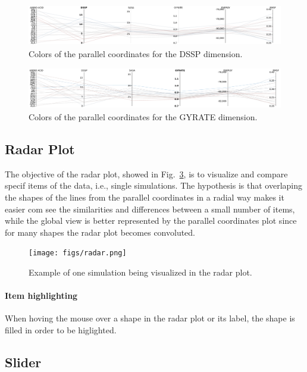 \documentclass[10pt, conference]{IEEEtran}
\begin{document}
\begin{figure}
\includegraphics[width=1.0\linewidth]{figs/dssp.png}
\caption{Colors of the parallel coordinates for the DSSP dimension.} 
\label{fig:dssp}
\end{figure}

\begin{figure}
\includegraphics[width=1.0\linewidth]{figs/gyrate.png}
\caption{Colors of the parallel coordinates for the GYRATE dimension.} 
\label{fig:gyrate}
\end{figure}

\subsection{Radar Plot}

The objective of the radar plot, showed in Fig.~\ref{fig:radar}, is to visualize and compare specif items of the data, i.e., single simulations. The hypothesis is that overlaping the shapes of the lines from the parallel coordinates in a radial way makes it easier com see the similarities and differences between a small number of items, while the global view is better represented by the parallel coordinates plot since for many shapes the radar plot becomes convoluted.  

\begin{figure}
\texttt{[image: figs/radar.png]}
\caption{Example of one simulation being visualized in the radar plot.} 
\label{fig:radar}
\end{figure}
\paragraph*{Item highlighting} When hoving the mouse over a shape in the radar plot or its label, the shape is filled in order to be higlighted.

\subsection{Slider}
\end{document}
